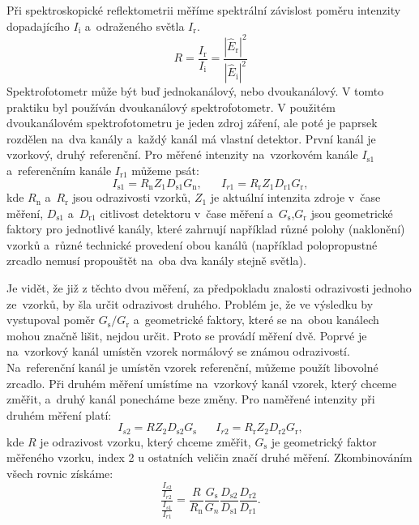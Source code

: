 \documentclass[12pt]{article}
\begin{document}
Při spektroskopické reflektometrii měříme spektrální závislost poměru intenzity dopadajícího $I_\mathrm{i}$ a~odraženého světla $I_\mathrm{r}$.
%
\begin{equation} R = \frac{I_\mathrm{r}}{I_\mathrm{i}} = \frac{|\hat{E}_\mathrm{r}|^2}{|\hat{E}_\mathrm{i}|^2}\end{equation}
%
Spektrofotometr může být buď jednokanálový, nebo dvoukanálový. V tomto praktiku byl používán dvoukanálový spektrofotometr. V použitém dvoukanálovém spektrofotometru je jeden zdroj záření, ale poté je paprsek rozdělen na~dva kanály a~každý kanál má vlastní detektor. První kanál je vzorkový, druhý referenční. Pro měřené intenzity na~vzorkovém kanále $I_\mathrm{s1}$ a~referenčním kanále $I_\mathrm{r1}$ můžeme psát:
%
\begin{equation} I_\mathrm{s1} = R_\mathrm{n} Z_1 D_\mathrm{s1} G_\mathrm{n} \mathrm{,}\;\;\;\;\;\; I_{r1} = R_\mathrm{r} Z_1 D_\mathrm{r1} G_\mathrm{r} \mathrm{,}\end{equation}
%
kde $R_\mathrm{n}$ a~$R_\mathrm{r}$ jsou odrazivosti vzorků, $Z_1$ je aktuální intenzita zdroje v~čase měření, $D_\mathrm{s1}$ a~$D_\mathrm{r1}$ citlivost detektoru v~čase měření a~$G_\mathrm{s}$,$G_\mathrm{r}$ jsou geometrické faktory pro jednotlivé kanály, které zahrnují například různé polohy (naklonění) vzorků a~různé technické provedení obou kanálů (například polopropustné zrcadlo nemusí propouštět na~oba dva kanály stejně světla). 

Je vidět, že již z těchto dvou měření, za předpokladu znalosti odrazivosti jednoho ze~vzorků, by šla určit odrazivost druhého. Problém je, že ve výsledku by vystupoval poměr $G_\mathrm{s}/G_\mathrm{r}$ a~geometrické faktory, které se na~obou kanálech mohou značně lišit, nejdou určit. Proto se provádí měření dvě. Poprvé je na~vzorkový kanál umístěn vzorek normálový se známou odrazivostí. Na~referenční kanál je umístěn vzorek referenční, můžeme použít libovolné zrcadlo. Při druhém měření umístíme na~vzorkový kanál vzorek, který chceme změřit, a~druhý kanál ponecháme beze změny. Pro naměřené intenzity při druhém měření platí:
\begin{equation} I_{s2} = R Z_2 D_\mathrm{s2} G_\mathrm{s} \;\;\;\;\;\; I_{r2} = R_\mathrm{r} Z_2 D_\mathrm{r2} G_\mathrm{r} \mathrm{,}\end{equation}
kde $R$ je odrazivost vzorku, který chceme změřit, $G_\mathrm{s}$ je geometrický faktor měřeného vzorku, index 2 u ostatních veličin značí druhé měření. Zkombinováním všech rovnic získáme:
\begin{equation}  \displaystyle\frac{\displaystyle\frac{I_{s2}}{I_{r2}} }{\displaystyle\frac{I_{s1}}{I_{r1}} } = \frac{R}{R_\mathrm{n}} \frac{G_\mathrm{s}}{G_n}\frac{D_\mathrm{s2}}{D_\mathrm{s1}}\frac{D_\mathrm{r2}}{D_\mathrm{r1}}\mathrm{.}\end{equation}
\end{document}
